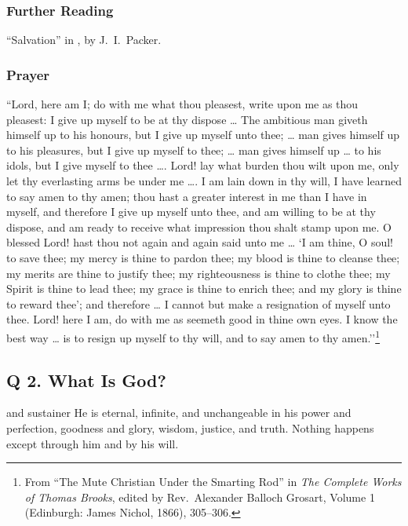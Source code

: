 \subsubsection{Further Reading}

``Salvation'' in , by J.\ I.\ Packer.

\subsubsection{Prayer}

\label{q1prayer}``Lord, here am I; do with me what thou pleasest, write upon me as thou pleasest: I give up myself to be at thy dispose \dots{} The ambitious man giveth himself up to his honours, but I give up myself unto thee; \dots{} man gives himself up to his pleasures, but I give up myself to thee; \dots{} man gives himself up \dots{} to his idols, but I give myself to thee \dots. Lord! lay what burden thou wilt upon me, only let thy everlasting arms be under me \dots. I am lain down in thy will, I have learned to say amen to thy amen; thou hast a greater interest in me than I have in myself, and therefore I give up myself unto thee, and am willing to be at thy dispose, and am ready to receive what impression thou shalt stamp upon me. O blessed Lord! hast thou not again and again said unto me \dots{} `I am thine, O soul! to save thee; my mercy is thine to pardon thee; my blood is thine to cleanse thee; my merits are thine to justify thee; my righteousness is thine to clothe thee; my Spirit is thine to lead thee; my grace is thine to enrich thee; and my glory is thine to reward thee’; and therefore \dots{} I cannot but make a resignation of myself unto thee. Lord! here I am, do with me as seemeth good in thine own eyes. I know the best way \dots{} is to resign up myself to thy will, and to say amen to thy amen.''\footnote{From ``The Mute Christian Under the Smarting Rod'' in {\em The Complete Works of Thomas Brooks}, edited by Rev.\ Alexander Balloch Grosart, Volume 1 (Edinburgh: James Nichol, 1866), 305--306.}







\subsection{Q  2. What Is God?}
and sustainer  He is eternal, infinite, and unchangeable in his power and perfection, goodness and glory, wisdom, justice, and truth. Nothing happens except through him and by his will.


